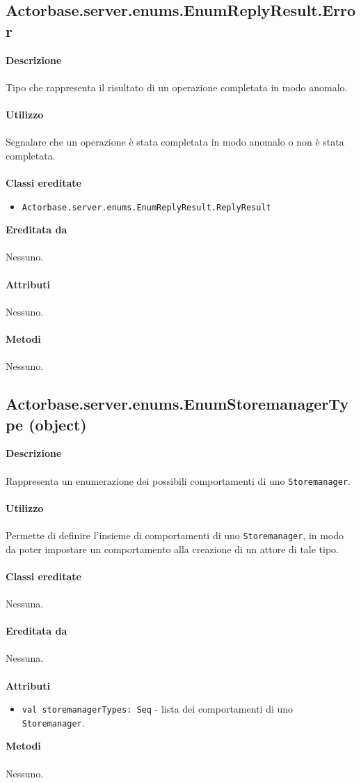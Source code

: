 \documentclass[a4paper]{article}
\begin{document}
	\subsection{Actorbase.server.enums.EnumReplyResult.Error}
		\textbf{Descrizione}
			\\ \\
			Tipo che rappresenta il risultato di un operazione completata in modo anomalo.
			\\ \\
		\textbf{Utilizzo}
			\\ \\
			Segnalare che un operazione è stata completata in modo anomalo o non è stata completata.
			\\ \\
		\textbf{Classi ereditate}
			\begin{itemize}
				\item \texttt{Actorbase.server.enums.EnumReplyResult.ReplyResult}
			\end{itemize}
		\textbf{Ereditata da}
		\\ \\
		Nessuno.
		\\ \\
		\textbf{Attributi}
		\\ \\
			Nessuno.
		\\ \\
		\textbf{Metodi}
			\\ \\
			Nessuno.
			
			\subsection{Actorbase.server.enums.EnumStoremanagerType (object)}
		\textbf{Descrizione}
			\\ \\
			Rappresenta un enumerazione dei possibili comportamenti di uno \texttt{Storemanager}.
			\\ \\
		\textbf{Utilizzo}
			\\ \\
			Permette di definire l'insieme di comportamenti di uno \texttt{Storemanager}, in modo da poter impostare un comportamento alla creazione di un attore di tale tipo.
			\\ \\
		\textbf{Classi ereditate}
		\\ \\
			Nessuna.
		\\ \\
		\textbf{Ereditata da}
		\\ \\
			Nessuna.
		\\ \\
		\textbf{Attributi}
			\begin{itemize}
				\item \texttt{val storemanagerTypes: Seq} - lista dei comportamenti di uno \texttt{Storemanager}.
			\end{itemize}
		\textbf{Metodi}
			\\ \\
			Nessuno.
	
\end{document}
